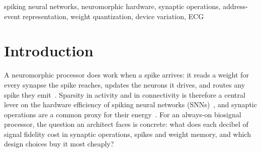 \documentclass[conference]{IEEEtran}
\begin{document}
\begin{IEEEkeywords}
spiking neural networks, neuromorphic hardware, synaptic operations,
address-event representation, weight quantization, device variation, ECG
\end{IEEEkeywords}

\section{Introduction}

A neuromorphic processor does work when a spike arrives: it reads a weight for
every synapse the spike reaches, updates the neurons it drives, and routes any
spike they emit~\cite{davies2018loihi}. Sparsity in activity and in
connectivity is therefore a central lever on the hardware efficiency of spiking
neural networks (SNNs)~\cite{aliyev2024sparsity}, and synaptic operations are a
common proxy for their energy~\cite{sorbaro2020energy}. For an always-on
biosignal processor, the question an architect faces is concrete: what does
each decibel of signal fidelity cost in synaptic operations, spikes and weight
memory, and which design choices buy it most cheaply?
\end{document}
